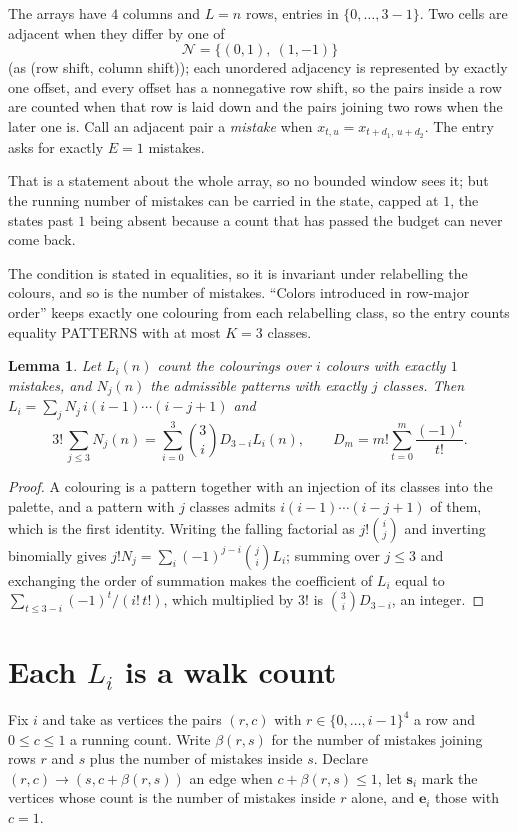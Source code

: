 \documentclass[11pt,a4paper]{article}
\theoremstyle{plain}
\newtheorem{lemma}[theorem]{Lemma}
\theoremstyle{definition}
\begin{document}
The arrays have $4$ columns and $L=n$ rows, entries in $\{0,\dots,3-1\}$.
Two cells are adjacent when they differ by one of
\[
\mathcal N=\{(0,1),\ (1,-1)\}
\]
(as (row shift, column shift)); each unordered adjacency is represented by exactly one
offset, and every offset has a nonnegative row shift, so the pairs inside a row are
counted when that row is laid down and the pairs joining two rows when the later one
is. Call an adjacent pair a \emph{mistake} when $x_{t,u}=x_{t+d_1,\,u+d_2}$. The entry asks for exactly
$E=1$ mistakes.

That is a statement about the whole array, so no bounded window sees it; but the running
number of mistakes can be carried in the state, capped at $1$, the states past $1$ being
absent because a count that has passed the budget can never come back.

The condition is stated in equalities, so it is invariant under relabelling the colours, and
so is the number of mistakes. ``Colors introduced in row-major order'' keeps exactly one
colouring from each relabelling class, so the entry counts equality PATTERNS with at most
$K=3$ classes.

\begin{lemma}\label{lem:inv}
Let $L_i(n)$ count the colourings over $i$ colours with exactly $1$ mistakes, and $N_j(n)$
the admissible patterns with exactly $j$ classes. Then
$L_i=\sum_j N_j\,i(i-1)\cdots(i-j+1)$ and
\[
3!\,\sum_{j\le3}N_j(n)=\sum_{i=0}^{3}\binom{3}{i}D_{3-i}L_i(n),
\qquad D_m=m!\sum_{t=0}^{m}\frac{(-1)^t}{t!} .
\]
\end{lemma}

\begin{proof}
A colouring is a pattern together with an injection of its classes into the palette, and a
pattern with $j$ classes admits $i(i-1)\cdots(i-j+1)$ of them, which is the first identity.
Writing the falling factorial as $j!\binom{i}{j}$ and inverting binomially gives
$j!N_j=\sum_i(-1)^{j-i}\binom{j}{i}L_i$; summing over $j\le3$ and exchanging the order
of summation makes the coefficient of $L_i$ equal to $\sum_{t\le3-i}(-1)^t/(i!\,t!)$,
which multiplied by $3!$ is $\binom{3}{i}D_{3-i}$, an integer.
\end{proof}

\section{Each $L_i$ is a walk count}

Fix $i$ and take as vertices the pairs $(r,c)$ with $r\in\{0,\dots,i-1\}^{4}$ a row
and $0\le c\le1$ a running count. Write $\beta(r,s)$ for the number of mistakes joining
rows $r$ and $s$ plus the number of mistakes inside $s$. Declare $(r,c)\to(s,c+\beta(r,s))$
an edge when $c+\beta(r,s)\le1$, let $\mathbf{s}_i$ mark the vertices whose count is the
number of mistakes inside $r$ alone, and $\mathbf{e}_i$ those with $c=1$.
\end{document}
